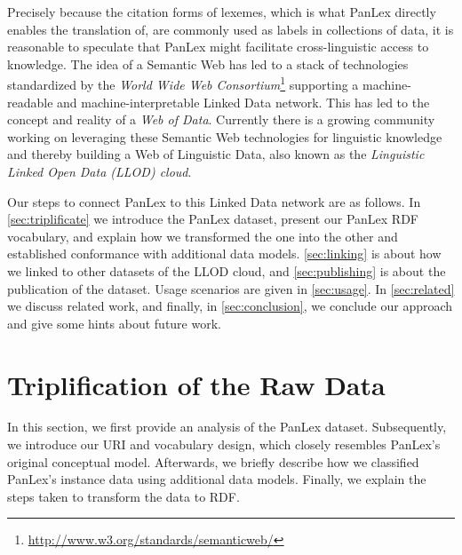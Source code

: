 \documentclass[sw]{iosart2c}
\begin{document}
Precisely because the citation forms of lexemes, which is what PanLex directly enables the translation of, are commonly used as labels in collections of data, it is reasonable to speculate that PanLex might facilitate cross-linguistic access to knowledge. The idea of a Semantic Web has led to a stack of technologies standardized by the
\emph{World Wide Web Consortium}\footnote{\url{http://www.w3.org/standards/semanticweb/}}
supporting a machine-readable and machine-interpretable Linked Data
network. This has led to the concept and reality of a \emph{Web of Data}.
Currently there is a growing community working on leveraging these Semantic Web
technologies for linguistic knowledge and thereby building a Web of Linguistic
Data, also known as the \emph{Linguistic Linked Open Data (LLOD) cloud}.

Our steps to connect PanLex to this Linked Data network are as follows.
In \autoref{sec:triplificate} we introduce the PanLex dataset, present our
PanLex RDF vocabulary, and explain how we transformed the one into the other and established conformance with additional data models.
\autoref{sec:linking} is about how we linked to other datasets of the LLOD cloud,
and \autoref{sec:publishing} is about the publication of the dataset.
Usage scenarios are given in \autoref{sec:usage}.
In \autoref{sec:related} we discuss related work, and finally, in \autoref{sec:conclusion}, we conclude our approach and give some hints about future work.

\section{Triplification of the Raw Data}
\label{sec:triplificate}
In this section, we first provide an analysis of the PanLex dataset.
Subsequently, we introduce our URI and vocabulary design, which closely
resembles PanLex's original conceptual model.
Afterwards, we briefly describe how we classified PanLex's
instance data using additional data models. Finally, we explain the steps
taken to transform the data to RDF.

\end{document}
